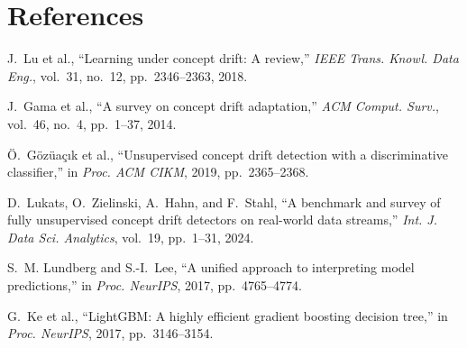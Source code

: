 \documentclass[10pt,twocolumn,a4paper]{article}
\begin{document}
\section*{References}
\begin{small}
\begin{enumerate}[label={[\arabic*]}, leftmargin=*, itemsep=1pt, parsep=0pt]
    \item J.~Lu et al., ``Learning under concept drift: A review,'' \textit{IEEE Trans. Knowl. Data Eng.}, vol.~31, no.~12, pp.~2346--2363, 2018.
    
    \item J.~Gama et al., ``A survey on concept drift adaptation,'' \textit{ACM Comput. Surv.}, vol.~46, no.~4, pp.~1--37, 2014.
    
    \item \"{O}.~G\"{o}z\"{u}a\c{c}{\i}k et al., ``Unsupervised concept drift detection with a discriminative classifier,'' in \textit{Proc. ACM CIKM}, 2019, pp.~2365--2368.

    \item D.~Lukats, O.~Zielinski, A.~Hahn, and F.~Stahl, ``A benchmark and survey of fully unsupervised concept drift detectors on real-world data streams,'' \textit{Int. J. Data Sci. Analytics}, vol.~19, pp.~1--31, 2024.
    
    \item S.~M. Lundberg and S.-I.~Lee, ``A unified approach to interpreting model predictions,'' in \textit{Proc. NeurIPS}, 2017, pp.~4765--4774.
    
    \item G.~Ke et al., ``LightGBM: A highly efficient gradient boosting decision tree,'' in \textit{Proc. NeurIPS}, 2017, pp.~3146--3154.
\end{enumerate}
\end{small}

\balance
\end{document}
